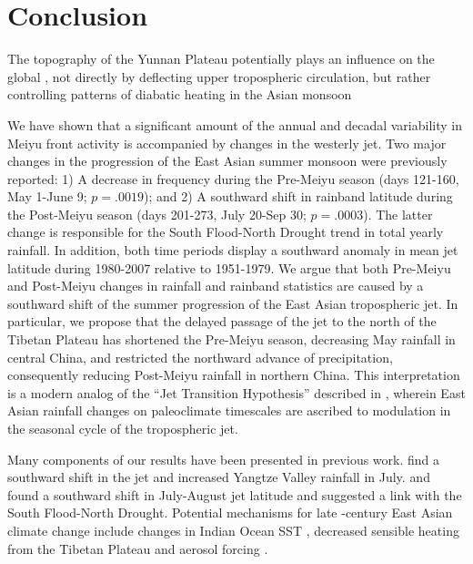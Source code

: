 	

		 
\section{Conclusion}

	The topography of the Yunnan Plateau potentially plays an influence on the global , not directly by deflecting upper tropospheric circulation, but rather controlling patterns of diabatic heating in the Asian monsoon

	We have shown that a significant amount of the annual and decadal variability in Meiyu front activity is accompanied by changes in the westerly jet. Two major changes in the progression of the East Asian summer monsoon were previously reported: 1) A decrease in frequency during the Pre-Meiyu season (days 121-160, May 1-June 9; $p=.0019$); and 2) A southward shift in rainband latitude during the Post-Meiyu season (days 201-273, July 20-Sep 30; $p=.0003$). The latter change is responsible for the South Flood-North Drought trend in total yearly rainfall. In addition, both time periods display a southward anomaly in mean jet latitude during 1980-2007 relative to 1951-1979. We argue that both Pre-Meiyu and Post-Meiyu changes in rainfall and rainband statistics are caused by a southward shift of the summer progression of the East Asian tropospheric jet. In particular, we propose that the delayed passage of the jet to the north of the Tibetan Plateau has shortened the Pre-Meiyu season, decreasing May rainfall in central China, and restricted the northward advance of precipitation, consequently reducing Post-Meiyu rainfall in northern China. This interpretation is a modern analog of the ``Jet Transition Hypothesis'' described in \citet{Chiang2015}, wherein East Asian rainfall changes on paleoclimate timescales are ascribed to modulation in the seasonal cycle of the tropospheric jet. 	
 
	Many components of our results have been presented in previous work. \citet{Xuan2011} find a southward shift in the jet and increased Yangtze Valley rainfall in July. \citet{Yu2004} and \citet{Yu2007} found a southward shift in July-August jet latitude and suggested a link with the South Flood-North Drought. Potential mechanisms for late -century East Asian climate change include changes in Indian Ocean SST \citep{Qu2012}, decreased sensible heating from the Tibetan Plateau \citep{Liu2012a,Hu2015} and aerosol forcing \citep{Song2014}.
	
